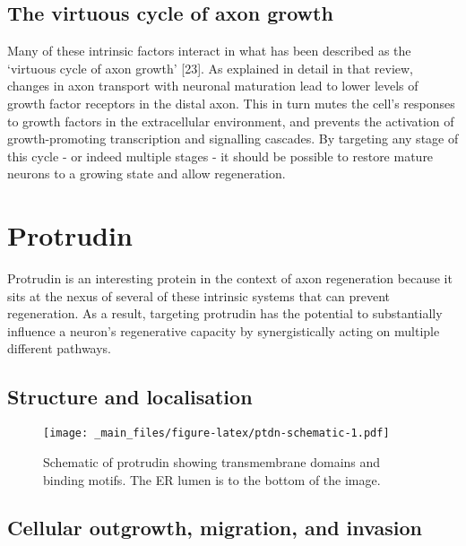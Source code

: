 \documentclass[
  12pt,
  a4paper,
]{book}
\begin{document}
\hypertarget{the-virtuous-cycle-of-axon-growth}{%
\subsection{The virtuous cycle of axon growth}\label{the-virtuous-cycle-of-axon-growth}}

Many of these intrinsic factors interact in what has been described as the `virtuous cycle of axon growth' {[}23{]}. As explained in detail in that review, changes in axon transport with neuronal maturation lead to lower levels of growth factor receptors in the distal axon. This in turn mutes the cell's responses to growth factors in the extracellular environment, and prevents the activation of growth-promoting transcription and signalling cascades. By targeting any stage of this cycle - or indeed multiple stages - it should be possible to restore mature neurons to a growing state and allow regeneration.

\hypertarget{protrudin}{%
\section{Protrudin}\label{protrudin}}

Protrudin is an interesting protein in the context of axon regeneration because it sits at the nexus of several of these intrinsic systems that can prevent regeneration. As a result, targeting protrudin has the potential to substantially influence a neuron's regenerative capacity by synergistically acting on multiple different pathways.

\hypertarget{structure-and-localisation}{%
\subsection{Structure and localisation}\label{structure-and-localisation}}

\begin{figure}
\centering
\texttt{[image: \_main\_files/figure-latex/ptdn-schematic-1.pdf]}
\caption{\label{fig:ptdn-schematic}Schematic of protrudin showing transmembrane domains and binding motifs. The ER lumen is to the bottom of the image.}
\end{figure}

\hypertarget{cellular-outgrowth-migration-and-invasion}{%
\subsection{Cellular outgrowth, migration, and invasion}\label{cellular-outgrowth-migration-and-invasion}}
\end{document}
